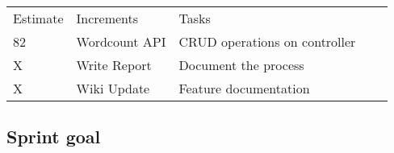 \begin{table}[]
\begin{tabular}{|l|l|l|ll}
\cline{1-3}
Estimate & Increments                         & Tasks                         &  &  \\ \cline{1-3}
82       & \multicolumn{1}{c|}{Wordcount API} & CRUD operations on controller &  &  \\ \cline{1-3}
X        & Write Report                       & Document the process          &  &  \\ \cline{1-3}
X        & Wiki Update                        & Feature documentation         &  &  \\ \cline{1-3}
\end{tabular}
\end{table}





\subsection{Sprint goal}
